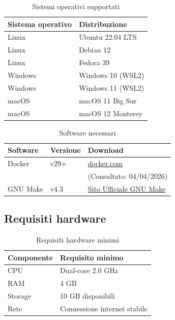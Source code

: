 \documentclass[a4paper,10pt]{article}
\begin{document}
\begin{table}[H]
\centering
\renewcommand{\arraystretch}{1.3}
\begin{tabular}{|l|l|}
\hline
\textbf{Sistema operativo} & \textbf{Distribuzione} \\ \hline

Linux & Ubuntu 22.04 LTS \\ 
Linux & Debian 12 \\ 
Linux & Fedora 39 \\ 

Windows & Windows 10 (WSL2) \\ 
Windows & Windows 11 (WSL2) \\ 

macOS & macOS 11 Big Sur \\ 
macOS & macOS 12 Monterey \\ \hline

\end{tabular}
\caption{Sistemi operativi supportati}
\end{table}

\begin{table}[H]
\centering
\renewcommand{\arraystretch}{1.3}
\begin{tabular}{|l|l|l|}
\hline
\textbf{Software} & \textbf{Versione} & \textbf{Download} \\ \hline
Docker & v29+ & \href{https://www.docker.com}{docker.com} \\ 
& & \small (Consultato: 04/04/2026) \\ \hline
GNU Make & v4.3 & \href{https://www.gnu.org/software/make/}{Sito Ufficiale GNU Make} \\ \hline


\end{tabular}
\caption{Software necessari}
\end{table}

\subsection{Requisiti hardware}
\begin{table}[H]
\centering
\renewcommand{\arraystretch}{1.3}
\begin{tabular}{|l|l|}
\hline
\textbf{Componente} & \textbf{Requisito minimo} \\ \hline

CPU & Dual-core 2.0 GHz \\ 
RAM & 4 GB \\ 
Storage & 10 GB disponibili \\ 
Rete & Connessione internet stabile \\ \hline

\end{tabular}
\caption{Requisiti hardware minimi}
\end{table}
\end{document}

